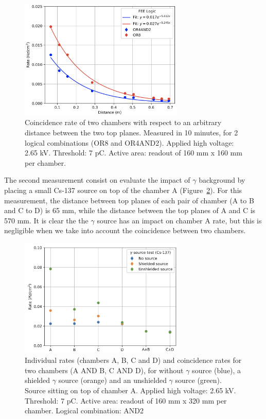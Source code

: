\begin{figure}[h]
\begin{center}
\includegraphics[width=0.7\textwidth,keepaspectratio]{figures/rpc/mwpc/coincidence.png}
\end{center}
\caption{Coincidence rate of two chambers with respect to an arbitrary distance between the two top planes. Measured in 10 minutes, for 2 logical combinations (OR8 and OR4AND2). Applied high voltage: 2.65 kV. Threshold: 7 pC. Active area: readout of 160 mm x 160 mm per chamber.}
\label{coincidence}
\end{figure}

The second measurement consist on evaluate the impact of $\gamma$ background by placing a small Cs-137 source on top of the chamber A (Figure~\ref{gamma}). For this measurement, the distance between top planes of each pair of chamber (A to B and C to D) is 65 mm, while the distance between the top planes of A and C is 570 mm. It is clear the the $\gamma$ source has an impact on chamber A rate, but this is negligible when we take into account the coincidence between two chambers.

\begin{figure}[h]
\begin{center}
\includegraphics[width=0.7\textwidth,keepaspectratio]{figures/rpc/mwpc/gamma.png}
\end{center}
\caption{Individual rates (chambers A, B, C and D) and coincidence rates for two chambers (A AND B, C AND D), for without $\gamma$ source (blue), a shielded $\gamma$ source (orange) and an unshielded $\gamma$ source (green). Source sitting on top of chamber A. Applied high voltage: 2.65 kV. Threshold: 7 pC. Active area: readout of 160 mm x 320 mm per chamber. Logical combination: AND2}
\label{gamma}
\end{figure}

